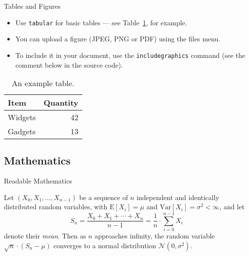 \documentclass[
	hyperref={unicode},	%
	english
	]{beamer}
\begin{document}
\begin{frame}{Tables and Figures}

\begin{itemize}
\item Use \texttt{tabular} for basic tables --- see Table~\ref{tab:widgets}, for example.
\item You can upload a figure (JPEG, PNG or PDF) using the files menu. 
\item To include it in your document, use the \texttt{includegraphics} command (see the comment below in the source code).
\end{itemize}


\begin{table}
\centering
\begin{tabular}{l|r}
Item & Quantity \\\hline
Widgets & 42 \\
Gadgets & 13
\end{tabular}
\caption{\label{tab:widgets}An example table.}
\end{table}

\end{frame}

\subsection{Mathematics}

\begin{frame}{Readable Mathematics}

Let $(X_0, X_1, \ldots, X_{n-1})$ be a sequence of $n$ independent and identically distributed random variables, with $\mathrm{E}[X_i] = \mu$ and $\mathrm{Var}[X_i] = \sigma^2 < \infty$, and let
\begin{equation}
S_n = \frac{X_0 + X_1 + \cdots + X_n}{n-1}
      = \frac{1}{n} \cdot\sum_{i=0}^{n-1} X_i
\label{eq:Mean}
\end{equation}
denote their \emph{mean}. Then as $n$ approaches infinity, the random variable 
$\sqrt{n} \cdot(S_n - \mu)$ converges
to a normal distribution $\mathcal{N}(0, \sigma^2)$.

\end{frame}
\end{document}
